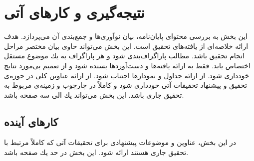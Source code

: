 
\chapter{نتیجه‌گیری و کارهای آتی}\label{chapter:5}
\thispagestyle{empty}

این بخش به بررسی محتوای پایان‌نامه، بیان نوآوری‌ها و جمع‌بندی آن می‌پردازد. هدف ارائه خلاصه‌ای از یافته‌های تحقیق است. این بخش می‌تواند حاوی بیان مختصر مراحل انجام تحقیق باشد. مطالب پاراگراف‌بندی شود و هر پاراگراف به یك موضوع مستقل اختصاص یابد. فقط به ارائه یافته‌ها و دست‌آوردها بسنده شود و از تعمیم بی‌مورد نتایج خودداری شود. از ارائه جداول و نمودارها اجتناب شود. از ارائه عناوین كلی در حوزه‌ی تحقیق و پیشنهاد تحقیقات آتی خودداری شود و كاملاً در چارچوب و زمینه‌ی مربوط به تحقیق جاری باشد. این بخش می‌تواند یك الی سه صفحه باشد. 

\section{کارهای آینده}
در این بخش، عناوین و موضوعات پیشنهادی برای تحقیقات آتی كه كاملاً مرتبط با تحقیق جاری هستند ارائه شود. این بخش در حد یك صفحه باشد. 


